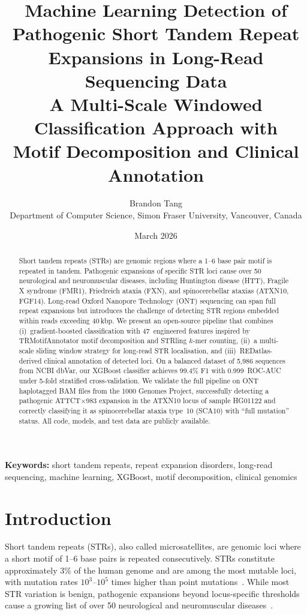 \documentclass[11pt,twocolumn]{article}
\title{%
    \textbf{Machine Learning Detection of Pathogenic Short Tandem Repeat
    Expansions in Long-Read Sequencing Data}\\[6pt]
    \large{A Multi-Scale Windowed Classification Approach with\\
    Motif Decomposition and Clinical Annotation}
}
\author{
    Brandon Tang
    \\[4pt]
    Department of Computer Science, Simon Fraser University, Vancouver, Canada
}
\date{March 2026}
\begin{document}
\maketitle

\begin{abstract}
Short tandem repeats (STRs) are genomic regions where a 1--6 base pair
motif is repeated in tandem.  Pathogenic expansions of specific STR loci
cause over 50 neurological and neuromuscular diseases, including
Huntington disease (HTT), Fragile X syndrome (FMR1), Friedreich ataxia
(FXN), and spinocerebellar ataxias (ATXN10, FGF14).  Long-read Oxford
Nanopore Technology (ONT) sequencing can span full repeat expansions
but introduces the challenge of detecting STR regions embedded within
reads exceeding 40\,kbp.  We present an open-source pipeline that
combines (i)~gradient-boosted classification with 47~engineered
features inspired by TRMotifAnnotator motif decomposition and STRling
$k$-mer counting, (ii)~a multi-scale sliding window strategy for
long-read STR localisation, and (iii)~REDatlas-derived clinical
annotation of detected loci.  On a balanced dataset of 5{,}986 sequences
from NCBI dbVar, our XGBoost classifier achieves 99.4\% F1 with
0.999~ROC-AUC under 5-fold stratified cross-validation.  We validate the
full pipeline on ONT haplotagged BAM files from the 1000 Genomes Project,
successfully detecting a pathogenic ATTCT$\times$983 expansion in the
ATXN10 locus of sample HG01122 and correctly classifying it as
spinocerebellar ataxia type~10 (SCA10) with ``full mutation'' status.
All code, models, and test data are publicly available.
\end{abstract}

\noindent\textbf{Keywords:} short tandem repeats, repeat expansion
disorders, long-read sequencing, machine learning, XGBoost,
motif decomposition, clinical genomics

\section{Introduction}\label{sec:introduction}

Short tandem repeats (STRs), also called microsatellites, are genomic
loci where a short motif of 1--6 base pairs is repeated consecutively.
STRs constitute approximately 3\% of the human genome and are among
the most mutable loci, with mutation rates $10^3$--$10^5$ times higher
than point mutations~\citep{gymrek2017}.  While most STR variation is
benign, pathogenic expansions beyond locus-specific thresholds cause
a growing list of over 50 neurological and neuromuscular
diseases~\citep{depienne2021}.
\end{document}

